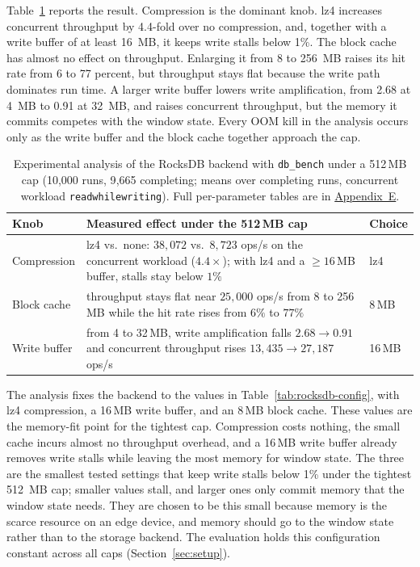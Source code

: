 Table~\ref{tab:rocksdb-char} reports the result.
Compression is the dominant knob.
lz4 increases concurrent throughput by 4.4-fold over no compression, and, together with a write buffer of at least 16\, MB, it keeps write stalls below 1\%.
The block cache has almost no effect on throughput.
Enlarging it from 8 to 256\, MB raises its hit rate from 6 to 77 percent, but throughput stays flat because the write path dominates run time.
A larger write buffer lowers write amplification, from 2.68 at 4\, MB to 0.91 at 32\, MB, and raises concurrent throughput, but the memory it commits competes with the window state.
Every OOM kill in the analysis occurs only as the write buffer and the block cache together approach the cap.

\begin{table}[ht]
\centering
\small
\begin{tabular}{|l|p{8.2cm}|l|}
\hline
\textbf{Knob} & \textbf{Measured effect under the 512\,MB cap} & \textbf{Choice} \\
\hline
Compression & lz4 vs.\ none: $38{,}072$ vs.\ $8{,}723$ ops/s on the concurrent workload ($4.4\times$); with lz4 and a $\geq 16$\,MB buffer, stalls stay below $1\%$ & lz4 \\
\hline
Block cache & throughput stays flat near $25{,}000$ ops/s from 8 to 256\,MB while the hit rate rises from $6\%$ to $77\%$ & 8\,MB \\
\hline
Write buffer & from 4 to 32\,MB, write amplification falls $2.68 \to 0.91$ and concurrent throughput rises $13{,}435 \to 27{,}187$ ops/s & 16\,MB \\
\hline
\end{tabular}
\caption[RocksDB backend analysis under a 512\,MB cap]{Experimental analysis of the RocksDB backend with \texttt{db\_bench}
under a 512\,MB cap (10{,}000 runs, 9{,}665 completing; means over completing
runs, concurrent workload \texttt{readwhilewriting}). Full per-parameter tables
are in \hyperref[app:rocksdb-tables]{Appendix~E}.}
\label{tab:rocksdb-char}
\end{table}

The analysis fixes the backend to the values in Table~\ref{tab:rocksdb-config}, with lz4 compression, a 16\,MB write buffer, and an 8\,MB block cache.
These values are the memory-fit point for the tightest cap.
Compression costs nothing, the small cache incurs almost no throughput overhead, and a 16\,MB write buffer already removes write stalls while leaving the most memory for window state.
The three are the smallest tested settings that keep write stalls below 1\% under the tightest 512\, MB cap; smaller values stall, and larger ones only commit memory that the window state needs.
They are chosen to be this small because memory is the scarce resource on an edge device, and memory should go to the window state rather than to the storage backend.
The evaluation holds this configuration constant across all caps (Section~\ref{sec:setup}).

